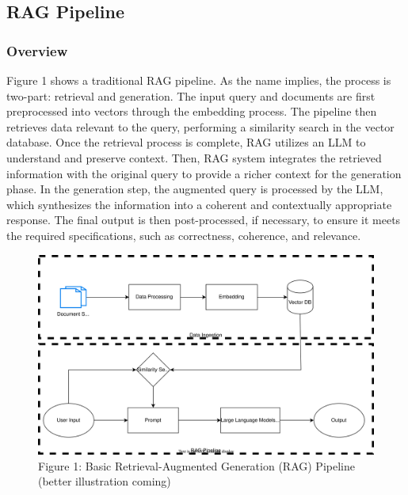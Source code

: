 \documentclass{scrartcl}
\begin{document}
\subsection{RAG Pipeline}
\subsubsection{Overview}
Figure 1 shows a traditional RAG pipeline. As the name implies, the process is two-part: retrieval and generation. 
The input query and documents are first preprocessed into vectors through the embedding process. 
The pipeline then retrieves data relevant to the query, performing a similarity search in the vector database. Once the retrieval process is complete, RAG utilizes an LLM to understand and preserve context. Then, RAG system integrates the retrieved information with the original query to provide a richer context for the generation phase.
In the generation step, the augmented query is processed by the LLM, which synthesizes the information into a coherent and contextually appropriate response. The final output is then post-processed, if necessary, to ensure it meets the required specifications, such as correctness, coherence, and relevance. 
\begin{figure}[H]
	\begin{center}
		\includegraphics[scale=0.7]{basic_RAG_pipeline.drawio.svg}
	\end{center}
	\caption{Figure 1: Basic Retrieval-Augmented Generation (RAG) Pipeline (better illustration coming)}
	\label{fig:ascent}
\end{figure}
\end{document}

